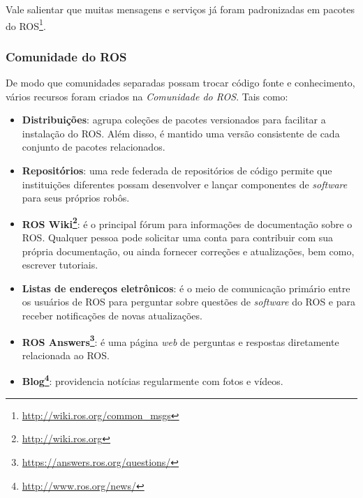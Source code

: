                 Vale salientar que muitas mensagens e serviços já foram padronizadas em pacotes do ROS\footnote{\url{http://wiki.ros.org/common_msgs}}.
            
            \subsubsection{Comunidade do ROS} \label{subsubsec:ros_comunidade}
                De modo que comunidades separadas possam trocar código fonte e conhecimento, vários recursos foram criados na \textit{Comunidade do ROS}. Tais como:
                
                \begin{itemize}
                    \item \textbf{Distribuições}: agrupa coleções de pacotes versionados para facilitar a instalação do ROS. Além disso, é mantido uma versão consistente de cada conjunto de pacotes relacionados.
                    
                    \item \textbf{Repositórios}: uma rede federada de repositórios de código permite que instituições diferentes possam desenvolver e lançar componentes de \textit{software} para seus próprios robôs.
                    
                    \item \textbf{ROS Wiki\footnote{\url{http://wiki.ros.org}}}: é o principal fórum para informações de documentação sobre o ROS. Qualquer pessoa pode solicitar uma conta para contribuir com sua própria documentação, ou ainda fornecer correções e atualizações, bem como, escrever tutoriais.
                    
                    \item \textbf{Listas de endereços eletrônicos}: é o meio de comunicação primário entre os usuários de ROS para perguntar sobre questões de \textit{software} do ROS e para receber notificações de novas atualizações.
                    
                    \item \textbf{ROS Answers\footnote{\url{https://answers.ros.org/questions/}}}: é uma página \textit{web} de perguntas e respostas diretamente relacionada ao ROS.
                    
                    \item \textbf{Blog\footnote{\url{http://www.ros.org/news/}}}: providencia notícias regularmente com fotos e vídeos.
                \end{itemize}
            
